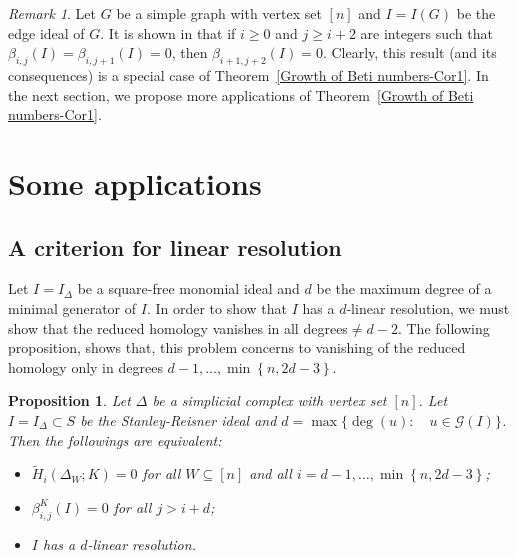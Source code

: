 \documentclass[a4paper,11pt]{amsart}
\theoremstyle{plain}
\newtheorem{prop}[thm]{Proposition}
\theoremstyle{definition}
\theoremstyle{remark}
\newtheorem{rem}{Remark}
\begin{document}
\begin{rem}
Let $G$ be a simple graph with vertex set $[n]$ and $I=I \left( {G} \right)$ be the edge ideal of ${G}$. It is shown in \cite[Theorem 1.8]{Oscar} that if $i \geq 0$ and $j \geq i+2$ are integers such that $\beta_{i,j} (I) = \beta_{i,j+1} (I) =0$, then $\beta_{i+1,j+2} (I) =0$. Clearly, this result (and its consequences) is a special case of Theorem~\ref{Growth of Beti numbers-Cor1}. In the next section, we propose more applications of Theorem~\ref{Growth of Beti numbers-Cor1}.
\end{rem}

\section{Some applications} \label{Applications}

\subsection*{A criterion for linear resolution}
Let $I= I_\Delta$ be a square-free monomial ideal and $d$ be the maximum degree of a minimal generator of $I$. In order to show that $I$ has a $d$-linear resolution, we must show that  the reduced homology vanishes in all degrees$\neq d-2$. The following proposition, shows that, this problem concerns to vanishing of the reduced homology only in degrees $d-1, \ldots, \min \left\{n, 2d-3 \right\}$.

\begin{prop} \label{vanishing of reduced homology}
Let $\Delta$ be a simplicial complex with vertex set $[n]$. Let $I=I_\Delta \subset S$ be the Stanley-Reisner ideal and $d= \max \{ \deg (u) \colon \quad u \in \mathcal{G}(I) \}$. Then the followings are equivalent:
\begin{itemize}
\item[\rm (a)] $\tilde{H}_i \left(\Delta_W; K \right) = 0$ for all $W \subseteq [n]$ and all $i= d-1, \ldots, \min \left\{n, 2d-3 \right\}$;
\item[\rm (b)] $\beta^K_{i,j}(I) = 0$ for all $j>i+d$;
\item[\rm (c)] $I$ has a $d$-linear resolution.
\end{itemize}
\end{prop}
\end{document}
